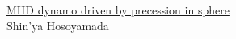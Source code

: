 \documentclass[12pt]{jsarticle}
\begin{document}


\newpage
\thispagestyle{empty}
\begin{center}
\Large{\underline{MHD dynamo driven by precession in sphere}}\\
\vspace{1.5cm}
\large{Shin'ya Hosoyamada}\\
\end{center}
\vspace{1cm}
\end{document}
